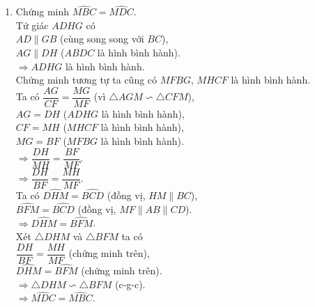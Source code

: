 \begin{bt}
{\begin{enumerate}
{
			}
			\item Chứng minh $\widehat{MBC}=\widehat{MDC}$.\\
			Tứ giác $ADHG$ có\\
			$AD\parallel GB$ (cùng song song với $BC$),\\
			$AG\parallel DH$ ($ABDC$ là hình bình hành).\\
			$\Rightarrow ADHG$ là hình bình hành.\\
			Chứng minh tương tự ta cũng có $MFBG$, $MHCF$ là hình bình hành.\\
			Ta có $\dfrac{AG}{CF}=\dfrac{MG}{MF}$ (vì $\triangle AGM \backsim \triangle CFM$),\\
			$AG=DH$ ($ADHG$ là hình bình hành),\\
			$CF=MH$ ($MHCF$ là hình bình hành),\\
			$MG=BF$ ($MFBG$ là hình bình hành).\\
			$\Rightarrow \dfrac{DH}{MH}=\dfrac{BF}{MF}$.\\
			$\Rightarrow \dfrac{DH}{BF}=\dfrac{MH}{MF}$.\\
			Ta có $\widehat{DHM}=\widehat{BCD}$ (đồng vị, $HM\parallel BC$),\\
			$\widehat{BFM}=\widehat{BCD}$ (đồng vị, $MF\parallel AB\parallel CD$).\\
			$\Rightarrow \widehat{DHM}=\widehat{BFM}$.\\
			Xét $\triangle DHM$ và $\triangle BFM$ ta có\\
			$\dfrac{DH}{BF}=\dfrac{MH}{MF}$ (chứng minh trên),\\
			$\widehat{DHM}=\widehat{BFM}$ (chứng minh trên).\\
			$\Rightarrow \triangle DHM \backsim \triangle BFM$ (c-g-c).\\
			$\Rightarrow \widehat{MDC}=\widehat{MBC}$.
		\end{enumerate}
	}
\end{bt}
